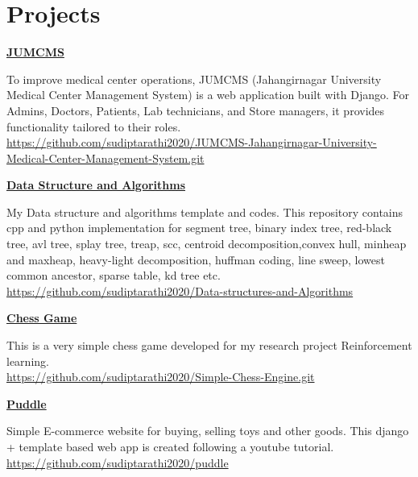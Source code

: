 \documentclass[a4paper,10pt]{article}
\begin{document}
\section*{Projects}
\href{https://github.com/sudiptarathi2020/JUMCMS-Jahangirnagar-University-Medical-Center-Management-System.git}{\textbf{JUMCMS}}
\begin{boxB}
    To improve medical center operations, JUMCMS (Jahangirnagar University Medical Center Management System) is a web application built with Django. For Admins, Doctors, Patients, Lab technicians, and Store managers, it provides functionality tailored to their roles. \\
    \href{https://github.com/sudiptarathi2020/JUMCMS-Jahangirnagar-University-Medical-Center-Management-System.git}{https://github.com/sudiptarathi2020/JUMCMS-Jahangirnagar-University-Medical-Center-Management-System.git}
\end{boxB}


\href{https://github.com/sudiptarathi2020/Data-structures-and-Algorithms}{\textbf{Data Structure and Algorithms}}
\begin{boxB}
    My Data structure and algorithms template and codes. This repository contains cpp and python implementation for segment tree, binary index tree, red-black tree, avl tree, splay tree, treap, scc, centroid decomposition,convex hull, minheap and maxheap, heavy-light decomposition, huffman coding, line sweep, lowest common ancestor, sparse table, kd tree etc.\\ \href{https://github.com/sudiptarathi2020/Data-structures-and-Algorithms}{https://github.com/sudiptarathi2020/Data-structures-and-Algorithms}
\end{boxB}

\href{https://github.com/sudiptarathi2020/Simple-Chess-Engine.git}{\textbf{Chess Game}}
\begin{boxB}
   This is a very simple chess game developed for my research project Reinforcement learning. \\ \href{https://github.com/sudiptarathi2020/Simple-Chess-Engine.git}{https://github.com/sudiptarathi2020/Simple-Chess-Engine.git}
\end{boxB}

\href{https://github.com/sudiptarathi2020/puddle}{\textbf{Puddle}}
\begin{boxB}
    Simple E-commerce website for buying, selling toys and other goods. This django + template based web app is created following a youtube tutorial.\\  \href{https://github.com/sudiptarathi2020/puddle}{https://github.com/sudiptarathi2020/puddle}
\end{boxB}
\end{document}

